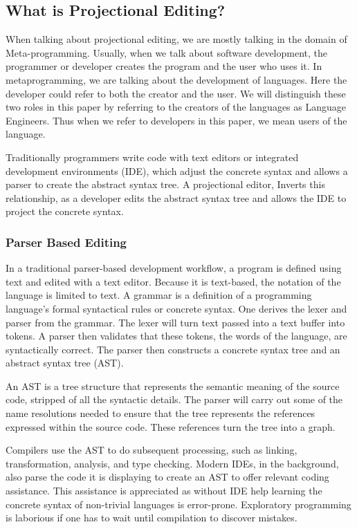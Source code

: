 \subsection{What is Projectional Editing?}
\label{section:WhatIsPE}

When talking about projectional editing, we are mostly talking in the domain of Meta-programming.
Usually, when we talk about software development, the programmer or developer creates the program and the user who uses it.
In metaprogramming, we are talking about the development of languages.
Here the developer could refer to both the creator and the user.
We will distinguish these two roles in this paper by referring to the creators of the languages as Language Engineers.
Thus when we refer to developers in this paper, we mean users of the language. 

Traditionally programmers write code with text editors or integrated development environments (IDE), which adjust the concrete syntax and allows a parser to create the abstract syntax tree.
A projectional editor, Inverts this relationship, as a developer edits the abstract syntax tree and allows the IDE to project the concrete syntax.

\subsubsection{Parser Based Editing}

In a traditional parser-based development workflow, a program is defined using text and edited with a text editor.
Because it is text-based, the notation of the language is limited to text.
A grammar is a definition of a programming language's formal syntactical rules or concrete syntax.
One derives the lexer and parser from the grammar.
The lexer will turn text passed into a text buffer into tokens.
A parser then validates that these tokens, the words of the language, are syntactically correct.
The parser then constructs a concrete syntax tree and an abstract syntax tree (AST).

An AST is a tree structure that represents the semantic meaning of the source code, stripped of all the syntactic details.
The parser will carry out some of the name resolutions needed to ensure that the tree represents the references expressed within the source code.
These references turn the tree into a graph.

Compilers use the AST to do subsequent processing, such as linking, transformation, analysis, and type checking.
Modern IDEs, in the background, also parse the code it is displaying to create an AST to offer relevant coding assistance.
This assistance is appreciated as without IDE help learning the concrete syntax of non-trivial languages is error-prone.
Exploratory programming is laborious if one has to wait until compilation to discover mistakes.

